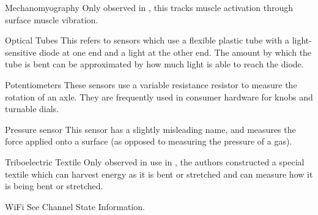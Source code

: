 \begin{Nomencl}[1cm]
    \item[Mechanomyography] Only observed in \cite{maHandGestureRecognition2017}, this tracks muscle activation through surface muscle vibration.
    \item[Optical Tubes] This refers to sensors which use a flexible plastic tube with a light-sensitive diode at one end and a light at the other end. The amount by which the tube is bent can be approximated by how much light is able to reach the diode.
    \item[Potentiometers] These sensors use a variable resistance resistor to measure the rotation of an axle. They are frequently used in consumer hardware for knobs and turnable dials.
    \item[Pressure sensor] This sensor has a slightly misleading name, and measures the force applied onto a surface (as opposed to measuring the pressure of a gas).
    \item[Triboelectric Textile] Only observed in use in \cite{wenMachineLearningGlove2020}, the authors constructed a special textile which can harvest energy as it is bent or stretched and can measure how it is being bent or stretched.
    \item[WiFi] See Channel State Information.


\end{Nomencl}

